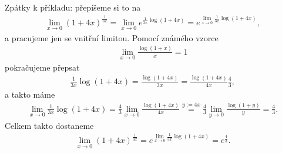 \documentclass[10pt,a4paper]{article}
\begin{document}
Zpátky k příkladu: přepíšeme si to na
\begin{align*}
\lim_{x \to 0} (1+4x)^\frac{1}{3x} = \lim_{x \to 0} e^{\frac{1}{3x} \log(1+4x)} = e^{\lim_{x \to 0} \frac{1}{3x} \log(1+4x)},
\end{align*}
a pracujeme jen se vnitřní limitou. Pomocí známého vzorce
\begin{align*}
\lim_{x \to 0} \frac{\log(1+x)}{x} = 1
\end{align*}
pokračujeme přepsat
\begin{align*}
\frac{1}{3x} \log(1+4x) = \frac{\log(1+4x)}{3x} = \frac{\log(1+4x)}{4x} \frac{4}{3},
\end{align*}
a takto máme
\begin{align*}
\lim_{x \to 0} \frac{1}{3x} \log(1+4x) = \frac43 \lim_{x \to 0} \frac{\log(1+4x)}{4x} \overset{y:=4x}{=} \frac43 \lim_{y \to 0} \frac{\log(1+y)}{y} = \frac43.
\end{align*}
Celkem takto dostaneme
\begin{align*}
\lim_{x \to 0} (1+4x)^\frac{1}{3x} = e^{\lim_{x \to 0} \frac{1}{3x} \log(1+4x)} = e^\frac43.
\end{align*}
\end{document}
